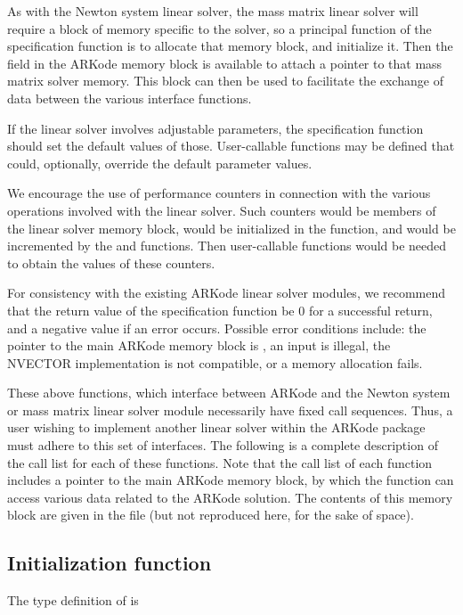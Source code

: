 \documentclass[letterpaper,10pt,english]{sphinxmanual}
\begin{document}
As with the Newton system linear solver, the mass matrix linear solver
will require a block of memory specific to the solver, so a principal
function of the specification function is to allocate that memory
block, and initialize it.  Then the field  in the
ARKode memory block  is available to attach a pointer to
that mass matrix solver memory.  This block can then be used to
facilitate the exchange of data between the various interface functions.

If the linear solver involves adjustable parameters, the specification
function should set the default values of those.  User-callable
functions may be defined that could, optionally, override the default
parameter values.

We encourage the use of performance counters in connection with the various
operations involved with the linear solver.  Such counters would be
members of the linear solver memory block, would be initialized in the
{\hyperref[linear_solvers/custom:minit]{}} function, and would be incremented by the
{\hyperref[linear_solvers/custom:msetup]{}} and {\hyperref[linear_solvers/custom:msolve]{}} functions.  Then
user-callable functions would be needed to obtain the values of these
counters.

For consistency with the existing ARKode linear solver modules, we
recommend that the return value of the specification function be 0 for
a successful return, and a negative value if an error occurs.
Possible error conditions include: the pointer to the main ARKode
memory block is , an input is illegal, the NVECTOR
implementation is not compatible, or a memory allocation fails.

These above functions, which interface between ARKode and the Newton
system or mass matrix linear solver module necessarily have fixed call
sequences.  Thus, a user wishing to implement another linear solver
within the ARKode package must adhere to this set of interfaces.  The
following is a complete description of the call list for each of these
functions.  Note that the call list of each function includes a pointer
to the main ARKode memory block, by which the function can access
various data related to the ARKode solution. The contents of this
memory block are given in the file  (but not
reproduced here, for the sake of space).


\subsection{Initialization function}
\label{linear_solvers/custom:initialization-function}
The type definition of {\hyperref[linear_solvers/custom:linit]{}} is
\end{document}
